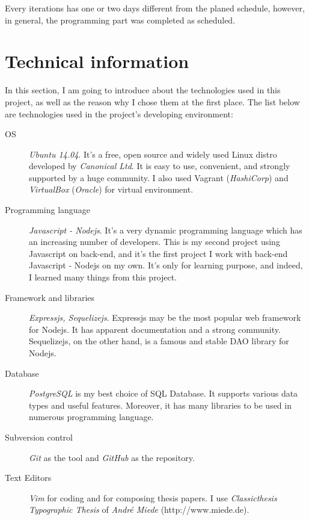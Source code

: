 Every iterations has one or two days different from the planed schedule, however, in general, the programming part was completed as scheduled.


\section{Technical information}
\label{ch:implementation:technical_information} 

In this section, I am going to introduce about the technologies used in this project, as well as the reason why I chose them at the first place.
The list below are technologies used in the project's developing environment:

\begin{description}
\item[OS] \emph{Ubuntu 14.04}.
It's a free, open source and widely used Linux distro developed by \emph{Canonical Ltd}.
It is easy to use, convenient, and strongly supported by a huge community.
I also used {Vagrant} (\emph{HashiCorp}) and \emph{VirtualBox} (\emph{Oracle}) for virtual environment.
\item[Programming language] \emph{Javascript - Nodejs}.
It's a very dynamic programming language which has an increasing number of developers.
This is my second project using Javascript on back-end, and it's the first project I work with back-end Javascript - Nodejs on my own. It's only for learning purpose, and indeed, I learned many things from this project.
\item[Framework and libraries] \emph{Expressjs, Sequelizejs}.
Expressjs may be the most popular web framework for Nodejs.
It has apparent documentation and a strong community.
Sequelizejs, on the other hand, is a famous and stable DAO library for Nodejs.
\item[Database] \emph{PostgreSQL} is my best choice of SQL Database.
It supports various data types and useful features.
Moreover, it has many libraries to be used in numerous programming language.
\item[Subversion control] \emph{Git} as the tool and \emph{GitHub} as the repository.
\item[Text Editors] \emph{Vim} for coding and \latex for composing thesis papers. I use \emph{Classicthesis Typographic Thesis} of \emph{André Miede} (http://www.miede.de).

\end{description}

